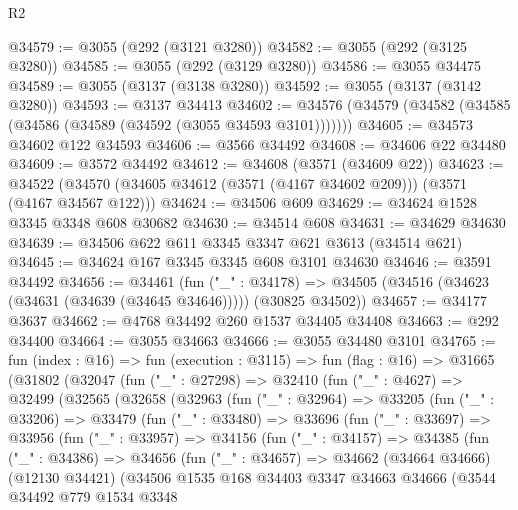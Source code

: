 \begin{lexlean}{R2}
\begin{coremodule}
@34579 := @3055 (@292 (@3121 @3280))
@34582 := @3055 (@292 (@3125 @3280))
@34585 := @3055 (@292 (@3129 @3280))
@34586 := @3055 @34475
@34589 := @3055 (@3137 (@3138 @3280))
@34592 := @3055 (@3137 (@3142 @3280))
@34593 := @3137 @34413
@34602 := @34576 (@34579 (@34582 (@34585 (@34586 (@34589 (@34592 (@3055 @34593 @3101)))))))
@34605 := @34573 @34602 @122 @34593
@34606 := @3566 @34492
@34608 := @34606 @22 @34480
@34609 := @3572 @34492
@34612 := @34608 (@3571 (@34609 @22))
@34623 := @34522 (@34570 (@34605 @34612 (@3571 (@4167 @34602 @209))) (@3571 (@4167 @34567 @122)))
@34624 := @34506 @609
@34629 := @34624 @1528 @3345 @3348 @608 @30682
@34630 := @34514 @608
@34631 := @34629 @34630
@34639 := @34506 @622 @611 @3345 @3347 @621 @3613 (@34514 @621)
@34645 := @34624 @167 @3345 @3345 @608 @3101 @34630
@34646 := @3591 @34492
@34656 := @34461
    (fun ("_" : @34178) =>
    @34505 (@34516 (@34623 (@34631 (@34639 (@34645 @34646))))) (@30825 @34502))
@34657 := @34177 @3637
@34662 := @4768 @34492 @260 @1537 @34405 @34408
@34663 := @292 @34400
@34664 := @3055 @34663
@34666 := @3055 @34480 @3101
@34765 := fun (index : @16) =>
  fun (execution : @3115) =>
  fun (flag : @16) =>
  @31665
    (@31802
      (@32047
        (fun ("_" : @27298) =>
        @32410
          (fun ("_" : @4627) =>
          @32499
            (@32565
              (@32658
                (@32963
                  (fun ("_" : @32964) =>
                  @33205
                    (fun ("_" : @33206) =>
                    @33479
                      (fun ("_" : @33480) =>
                      @33696
                        (fun ("_" : @33697) =>
                        @33956
                          (fun ("_" : @33957) =>
                          @34156
                            (fun ("_" : @34157) =>
                            @34385
                              (fun ("_" : @34386) =>
                              @34656
                                (fun ("_" : @34657) =>
                                @34662
                                  (@34664 @34666)
                                  (@12130 @34421)
                                  (@34506
                                    @1535
                                    @168
                                    @34403
                                    @3347
                                    @34663
                                    @34666
                                    (@3544
                                      @34492
                                      @779
                                      @1534
                                      @3348

\end{coremodule}
\end{lexlean}
